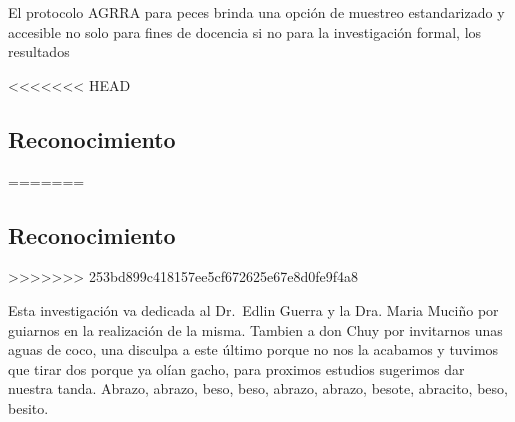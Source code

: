 \documentclass[
  authoryear,
  preprint,
  3p]{elsarticle}
\begin{document}
El protocolo AGRRA para peces brinda una opción de muestreo
estandarizado y accesible no solo para fines de docencia si no para la
investigación formal, los resultados

<<<<<<< HEAD
\subsection{Reconocimiento}\label{reconocimiento}
=======
\hypertarget{reconocimiento}{%
\subsection{Reconocimiento}\label{reconocimiento}}
>>>>>>> 253bd899c418157ee5cf672625e67e8d0fe9f4a8

Esta investigación va dedicada al Dr.~Edlin Guerra y la Dra. Maria
Muciño por guiarnos en la realización de la misma. Tambien a don Chuy
por invitarnos unas aguas de coco, una disculpa a este último porque no
nos la acabamos y tuvimos que tirar dos porque ya olían gacho, para
proximos estudios sugerimos dar nuestra tanda. Abrazo, abrazo, beso,
beso, abrazo, abrazo, besote, abracito, beso, besito.


\renewcommand\refname{References}
  
\end{document}
